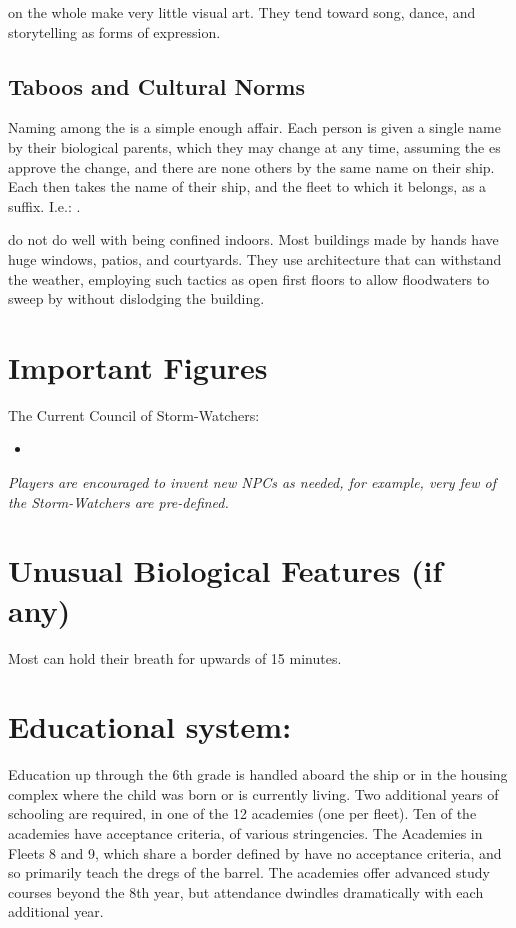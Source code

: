 \documentclass[blue]{GL2020}
\begin{document}
\pShippies{} on the whole make very little visual art. They tend toward song, dance, and storytelling as forms of expression.

\subsection*{Taboos and Cultural Norms}
Naming among the \pShip{} is a simple enough affair. Each person is given a single name by their biological parents, which they may change at any time, assuming the \cEbb{\God}es approve the change, and there are none others by the same name on their ship. Each \pShippies{} then takes the name of their ship, and the fleet to which it belongs, as a suffix. I.e.: \cLoud{\full}.

\pShippies{} do not do well with being confined indoors. Most buildings made by \pShip{} hands have huge windows, patios, and courtyards. They use architecture that can withstand the weather, employing such tactics as open first floors to allow floodwaters to sweep by without dislodging the building.

\section*{Important Figures}
The Current Council of Storm-Watchers:
\begin{itemize}
	\item \cLoud{}
\end{itemize}

\emph{Players are encouraged to invent new NPCs as needed, for example, very few of the Storm-Watchers are pre-defined.}

\section*{Unusual Biological Features (if any)}
Most \pShippies{} can hold their breath for upwards of 15 minutes.

\section{Educational system:}
Education up through the 6th grade is handled aboard the ship or in the housing complex where the child was born or is currently living. Two additional years of schooling are required, in one of the 12 academies (one per fleet). Ten of the academies have acceptance criteria, of various stringencies. The Academies in Fleets 8 and 9, which share a border defined by \pWod{} have no acceptance criteria, and so primarily teach the dregs of the barrel. The academies offer advanced study courses beyond the 8th year, but attendance dwindles dramatically with each additional year.
\end{document}
